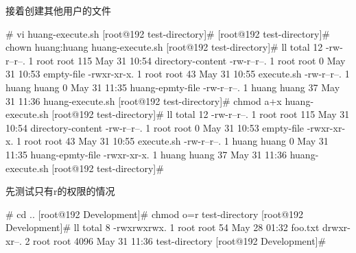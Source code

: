 接着创建其他用户的文件
\begin{Bash}
# vi huang-execute.sh
[root@192 test-directory]# 
[root@192 test-directory]# chown huang:huang huang-execute.sh 
[root@192 test-directory]# ll
total 12
-rw-r--r--. 1 root  root  115 May 31 10:54 directory-content
-rw-r--r--. 1 root  root    0 May 31 10:53 empty-file
-rwxr-xr-x. 1 root  root   43 May 31 10:55 execute.sh
-rw-r--r--. 1 huang huang   0 May 31 11:35 huang-epmty-file
-rw-r--r--. 1 huang huang  37 May 31 11:36 huang-execute.sh
[root@192 test-directory]# chmod a+x huang-execute.sh 
[root@192 test-directory]# ll
total 12
-rw-r--r--. 1 root  root  115 May 31 10:54 directory-content
-rw-r--r--. 1 root  root    0 May 31 10:53 empty-file
-rwxr-xr-x. 1 root  root   43 May 31 10:55 execute.sh
-rw-r--r--. 1 huang huang   0 May 31 11:35 huang-epmty-file
-rwxr-xr-x. 1 huang huang  37 May 31 11:36 huang-execute.sh
[root@192 test-directory]# 

\end{Bash}

先测试只有r的权限的情况
\begin{Bash}# cd ..
[root@192 Development]# chmod o=r test-directory
[root@192 Development]# ll
total 8
-rwxrwxrwx. 1 root root   54 May 28 01:32 foo.txt
drwxr-xr--. 2 root root 4096 May 31 11:36 test-directory
[root@192 Development]# 

\end{Bash}



